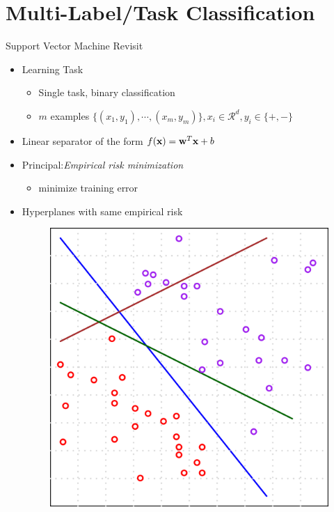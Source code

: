 \documentclass[first=dgreen,second=purple,logo=yellowexc]{aaltoslides}
\newcommand{\xb}{{\bf x}}
\newcommand{\wb}{{\bf w}}
\begin{document}
\section{Multi-Label/Task Classification}
\begin{frame}{Support Vector Machine Revisit}
\begin{itemize}
    \item Learning Task 
    \begin{itemize}
        \item Single task, binary classification
        \item $m$ examples $\{(x_1,y_{1}),\cdots,(x_m,y_{m})\},x_i\in\mathcal{R}^d,y_i\in\{+,-\}$
    \end{itemize}
    \item Linear separator of the form $f(\xb) = \wb^T \xb + b$
    \item Principal:{\em Empirical risk minimization}
    \begin{itemize}
        \item minimize training error
    \end{itemize}
    \item Hyperplanes with same empirical risk
    \begin{figure}
        \includegraphics[scale=0.15]{./plots/empirical_risk.pdf}\,

\end{figure}
\end{itemize}
\end{frame}
\end{document}
